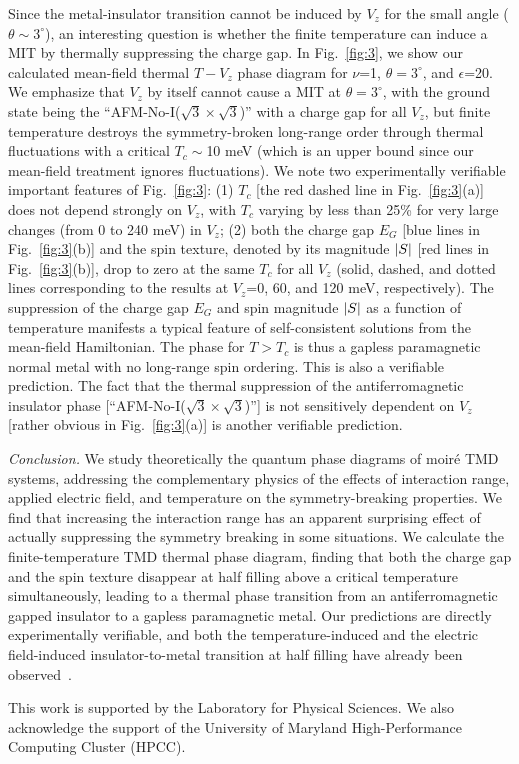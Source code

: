 \documentclass[aps,prb,twocolumn,superscriptaddress,longbibliography]{revtex4-2}
\begin{document}
Since the metal-insulator transition cannot be induced by $V_z$ for the small angle ($\theta\sim 3^\circ$), an interesting question is whether the finite temperature can induce a MIT by thermally suppressing the charge gap. In Fig.~\ref{fig:3}, we show our calculated mean-field thermal $T-V_z$ phase diagram for $\nu$=1, $\theta=3^\circ$, and $\epsilon$=20.  We emphasize that $V_z$  by itself cannot cause a MIT at $\theta=3^\circ$, with the ground state being the ``AFM-No-I($\sqrt{3}\times\sqrt{3}$)'' with a charge gap for all $V_z$, but finite temperature destroys the symmetry-broken long-range order through thermal fluctuations with a critical $T_c\sim$10 meV (which is an upper bound since our mean-field treatment ignores fluctuations).  We note two experimentally verifiable important features of Fig.~\ref{fig:3}: (1) $T_c$ [the red dashed line in Fig.~\ref{fig:3}(a)] does not depend strongly on $V_z$, with $T_c $ varying by less than 25\% for very large changes (from 0 to 240 meV) in $V_z$; (2) both the charge gap $E_G$ [blue lines in Fig.~\ref{fig:3}(b)] and the spin texture, denoted by its magnitude $\abs{S}$ [red lines in Fig.~\ref{fig:3}(b)], drop to zero at the same $T_c$ for all $V_z$ (solid, dashed, and dotted lines corresponding to the results at $V_z$=0, 60, and 120 meV, respectively). The suppression of the charge gap $E_G$ and spin magnitude $\abs{S}$ as a function of temperature manifests a typical feature of self-consistent solutions from the mean-field Hamiltonian.  The phase for $T>T_c$ is thus a gapless paramagnetic normal metal with no long-range spin ordering. This is also a verifiable prediction.  The fact that the thermal suppression of the antiferromagnetic insulator phase [``AFM-No-I($\sqrt{3}\times\sqrt{3}$)''] is not sensitively dependent on $V_z$ [rather obvious in Fig.~\ref{fig:3}(a)]  is another verifiable prediction.

\textit{Conclusion.} We study theoretically the quantum phase diagrams of moir\'e TMD systems, addressing the complementary physics of the effects of interaction range, applied electric field, and temperature on the symmetry-breaking properties.  We find that increasing the interaction range has an apparent surprising effect of actually suppressing the symmetry breaking in some situations.  We calculate the finite-temperature TMD thermal phase diagram, finding that both the charge gap and the spin texture disappear at half filling above a critical temperature simultaneously, leading to a thermal phase transition from an antiferromagnetic gapped insulator to a gapless paramagnetic metal.  Our predictions are directly experimentally verifiable, and both the temperature-induced and the electric field-induced insulator-to-metal transition at half filling have already been observed~\cite{li2021continuous,ghiotto2021quantum}.

This work is supported by the Laboratory for Physical Sciences. We also acknowledge the support of the University of Maryland High-Performance Computing Cluster (HPCC).


\end{document}
